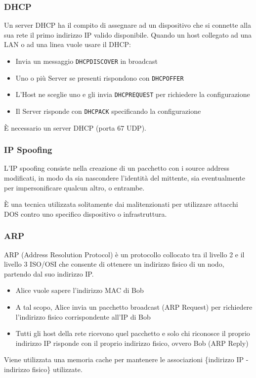 \documentclass[aspectratio=169]{beamer}
\begin{document}
    \begin{frame}
        \frametitle{DHCP}
        Un server DHCP ha il compito di assegnare ad un dispositivo che si connette alla sua rete il primo indirizzo IP valido disponibile.
        Quando un host collegato ad una LAN o ad una linea vuole usare il DHCP:
        \begin{itemize}
            \item Invia un messaggio \texttt{DHCPDISCOVER} in broadcast
            \item Uno o più Server se presenti rispondono con \texttt{DHCPOFFER}
            \item L'Host ne sceglie uno e gli invia \texttt{DHCPREQUEST} per richiedere la configurazione
            \item Il Server risponde con \texttt{DHCPACK} specificando la configurazione
        \end{itemize}
        È necessario un server DHCP (porta 67 UDP).
    \end{frame}
    
    
    \begin{frame}
        \frametitle{IP Spoofing}
        L'IP spoofing consiste nella creazione di un pacchetto con i source address modificati, in modo da sia nascondere l'identità del mittente, sia eventualmente per impersonificare qualcun altro, o entrambe. 
        
        È una tecnica utilizzata solitamente dai malitenzionati per utilizzare attacchi DOS contro uno specifico dispositivo o infrastruttura.
    \end{frame}
    
    \begin{frame}
        \frametitle{ARP}
        ARP (Address Resolution Protocol) è un protocollo collocato tra il livello 2 e il livello 3 ISO/OSI che consente di ottenere un indirizzo fisico di un nodo, partendo dal suo indirizzo IP.
        \begin{itemize}
            \item Alice vuole sapere l'indirizzo MAC di Bob
            \item A tal scopo, Alice invia un pacchetto broadcast (ARP Request) per richiedere l'indirizzo fisico corrispondente all'IP di Bob
            \item  Tutti gli host della rete ricevono quel pacchetto e solo chi riconosce il proprio indirizzo IP risponde con il proprio indirizzo fisico, ovvero Bob (ARP Reply)
        \end{itemize}
        Viene utilizzata una memoria cache per mantenere le associazioni \{indirizzo IP - indirizzo fisico\} utilizzate.
    \end{frame}
    
\end{document}
